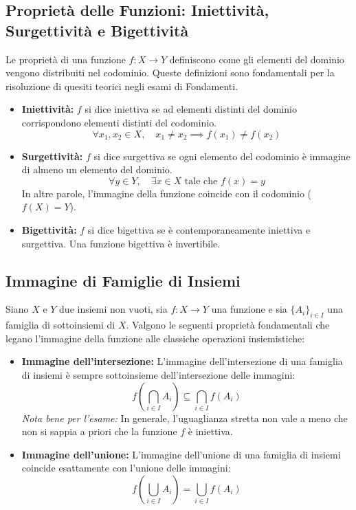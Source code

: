 \documentclass[12pt, a4paper]{article}
\begin{document}
\subsection{Proprietà delle Funzioni: Iniettività, Surgettività e Bigettività}
Le proprietà di una funzione $f: X \to Y$ definiscono come gli elementi del dominio vengono distribuiti nel codominio. Queste definizioni sono fondamentali per la risoluzione di quesiti teorici negli esami di Fondamenti.

\begin{itemize}
    \item \textbf{Iniettività:} $f$ si dice iniettiva se ad elementi distinti del dominio corrispondono elementi distinti del codominio.
    \[ \forall x_1, x_2 \in X, \quad x_1 \neq x_2 \implies f(x_1) \neq f(x_2) \]
    \item \textbf{Surgettività:} $f$ si dice surgettiva se ogni elemento del codominio è immagine di almeno un elemento del dominio.
    \[ \forall y \in Y, \quad \exists x \in X \text{ tale che } f(x) = y \]
    In altre parole, l'immagine della funzione coincide con il codominio ($f(X) = Y$).
    \item \textbf{Bigettività:} $f$ si dice bigettiva se è contemporaneamente iniettiva e surgettiva. Una funzione bigettiva è invertibile.
\end{itemize}


\subsection{Immagine di Famiglie di Insiemi}
Siano $X$ e $Y$ due insiemi non vuoti, sia $f: X \to Y$ una funzione e sia $\{A_i\}_{i \in I}$ una famiglia di sottoinsiemi di $X$. Valgono le seguenti proprietà fondamentali che legano l'immagine della funzione alle classiche operazioni insiemistiche:

\begin{itemize}
    \item \textbf{Immagine dell'intersezione:} L'immagine dell'intersezione di una famiglia di insiemi è sempre sottoinsieme dell'intersezione delle immagini:
    \[ f\left(\bigcap_{i \in I} A_i\right) \subseteq \bigcap_{i \in I} f(A_i) \]
    \emph{Nota bene per l'esame:} In generale, l'uguaglianza stretta non vale a meno che non si sappia a priori che la funzione $f$ è iniettiva.
    \item \textbf{Immagine dell'unione:} L'immagine dell'unione di una famiglia di insiemi coincide esattamente con l'unione delle immagini:
    \[ f\left(\bigcup_{i \in I} A_i\right) = \bigcup_{i \in I} f(A_i) \]
\end{itemize}
\end{document}

